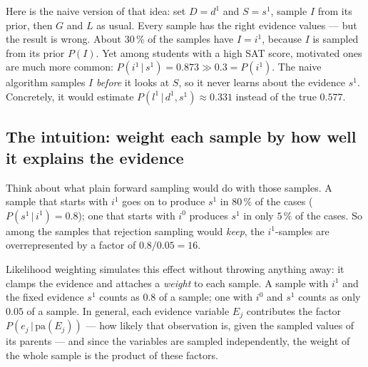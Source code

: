 \documentclass[11pt, oneside]{book}
\newcommand{\Prob}{\mathbb{P}}           %
\newcommand{\given}{\,\vert\,}           %
\newcommand{\pa}{\mathrm{pa}}            %
\let\originalsubsection\subsection
\renewcommand{\subsection}{\Needspace{6\baselineskip}\originalsubsection}
\begin{document}
Here is the naive version of that idea: set $D = d^1$ and $S = s^1$, sample
$I$ from its prior, then $G$ and $L$ as usual. Every sample has the right
evidence values --- but the result is wrong. About 30\,\% of the samples have
$I = i^1$, because $I$ is sampled from its prior $P(I)$. Yet among students
with a high SAT score, motivated ones are much more common: $P(i^1 \given s^1)
= 0.873 \gg 0.3 = P(i^1)$. The naive algorithm samples $I$ \emph{before} it
looks at $S$, so it never learns about the evidence $s^1$. Concretely, it
would estimate $P(l^1 \given d^1, s^1) \approx 0.331$ instead of the true
$0.577$.

\subsection{The intuition: weight each sample by how well it explains the evidence}

Think about what plain forward sampling would do with those samples. A sample
that starts with $i^1$ goes on to produce $s^1$ in $80\,\%$ of the cases
($P(s^1 \given i^1) = 0.8$); one that starts with $i^0$ produces $s^1$ in only
$5\,\%$ of the cases. So among the samples that rejection sampling would
\emph{keep}, the $i^1$-samples are overrepresented by a factor of
$0.8/0.05 = 16$.

Likelihood weighting simulates this effect without throwing anything away:
it clamps the evidence and attaches a \emph{weight} to each sample. A sample
with $i^1$ and the fixed evidence $s^1$ counts as $0.8$ of a sample; one with
$i^0$ and $s^1$ counts as only $0.05$ of a sample. In general, each evidence
variable $E_j$ contributes the factor $P(e_j \given \pa(E_j))$ --- how likely
that observation is, given the sampled values of its parents --- and since
the variables are sampled independently, the weight of the whole sample is
the product of these factors.
\end{document}
